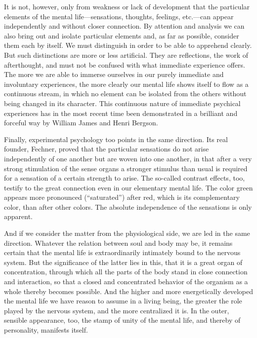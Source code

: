 \documentclass[12pt]{article}
\newcommand{\opage}[1]{\marginnote{\footnotesize\textit{[#1]}}}
\begin{document}
\opage{32}%
It is not, however, only from weakness or lack of development that the
particular elements of the mental life---sensations, thoughts, feelings,
etc.---can appear independently and without closer connection. By attention and
analysis we can also bring out and isolate particular elements and, as far as
possible, consider them each by itself. We must distinguish in order to be able
to apprehend clearly. But such distinctions are more or less artificial. They
are reflections, the work of afterthought, and must not be confused with what
immediate experience offers. The more we are able to immerse ourselves in our
purely immediate and involuntary experiences, the more clearly our mental life
shows itself to flow as a continuous stream, in which no element can be isolated
from the others without being changed in its character. This continuous nature
of immediate psychical experiences has in the most recent time been demonstrated
in a brilliant and forceful way by William James and Henri Bergson.

Finally, experimental psychology too points in the same direction. Its real
founder, Fechner, proved
\opage{33}%
that the particular sensations do not arise independently of one another but are
woven into one another, in that after a very strong stimulation of the sense
organs a stronger stimulus than usual is required for a sensation of a certain
strength to arise. The so-called contrast effects, too, testify to the great
connection even in our elementary mental life. The color green appears more
pronounced (``saturated'') after red, which is its complementary color, than
after other colors. The absolute independence of the sensations is only
apparent.

And if we consider the matter from the physiological side, we are led in the
same direction. Whatever the relation between soul and body may be, it remains
certain that the mental life is extraordinarily intimately bound to the nervous
system. But the significance of the latter lies in this, that it is a great
organ of concentration, through which all the parts of the body stand in close
connection and interaction, so that a closed and concentrated behavior of the
organism as a whole thereby becomes possible. And the higher and more
energetically developed the mental life we have reason to assume in a living
being, the greater the role played
\opage{34}%
by the nervous system, and the more centralized it is. In the outer, sensible
appearance, too, the stamp of unity of the mental life, and thereby of
personality, manifests itself.
\end{document}
